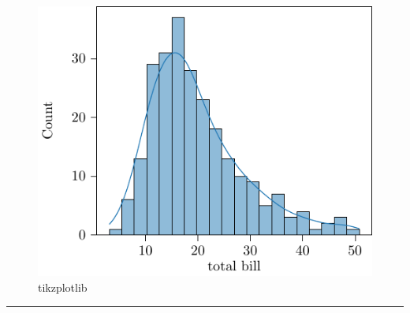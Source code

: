 \documentclass[
]{book}
\theoremstyle{definition}
\theoremstyle{definition}
\theoremstyle{definition}
\theoremstyle{definition}
\theoremstyle{remark}
\begin{document}
\begin{figure}
\centering
\includegraphics{202403181222-MatPlotLib_files/figure-latex/unnamed-chunk-78-1.pdf}
\caption{\label{fig:unnamed-chunk-78}tikzplotlib}
\end{figure}

\begin{center}\rule{0.5\linewidth}{0.5pt}\end{center}
\end{document}
